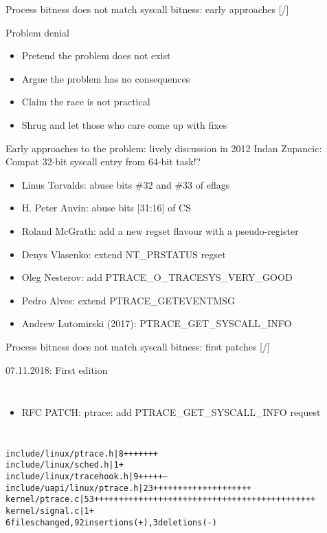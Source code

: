\documentclass[unicode,aspectratio=169]{beamer}
\begin{document}
\begin{frame}{Process bitness does not match syscall bitness: early approaches \hfill [\insertframenumber/\inserttotalframenumber]}
\begin{block}{Problem denial}
\begin{itemize}
	\item Pretend the problem does not exist
	\item Argue the problem has no consequences
	\item Claim the race is not practical
	\item Shrug and let those who care come up with fixes
\end{itemize}
\end{block}
\begin{block}{Early approaches to the problem: lively discussion in 2012}
Indan Zupancic: Compat 32-bit syscall entry from 64-bit task!?
\scriptsize
\begin{itemize}
	\item Linus Torvalds: abuse bits \#32 and \#33 of eflags
	\item H. Peter Anvin: abuse bits [31:16] of CS
	\item Roland McGrath: add a new regset flavour with a pseudo-register
	\item Denys Vlasenko: extend NT\_PRSTATUS regset
	\item Oleg Nesterov: add PTRACE\_O\_TRACESYS\_VERY\_GOOD
	\item Pedro Alves: extend PTRACE\_GETEVENTMSG
	\item Andrew Lutomirski (2017): PTRACE\_GET\_SYSCALL\_INFO
\end{itemize}
\end{block}
\end{frame}

\begin{frame}[fragile]{Process bitness does not match syscall bitness: first patches \hfill [\insertframenumber/\inserttotalframenumber]}
\begin{block}{07.11.2018: First edition}
	\begin{columns}
		\column{3cm}
			\centerline{}
		\column{7cm}
			\begin{itemize}
				\item RFC PATCH: ptrace: add PTRACE\_GET\_SYSCALL\_INFO request
			\end{itemize}
	\end{columns}
\begin{alltt}
include/linux/ptrace.h      |  8 +++++++
include/linux/sched.h       |  1 +
include/linux/tracehook.h   |  9 +++++---
include/uapi/linux/ptrace.h | 23 ++++++++++++++++++++
kernel/ptrace.c             | 53 +++++++++++++++++++++++++++++++++++++++++++++
kernel/signal.c             |  1 +
6 files changed, 92 insertions(+), 3 deletions(-)
\end{alltt}
\end{block}
\end{frame}
\end{document}
